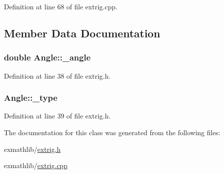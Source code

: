 Definition at line 68 of file extrig.\+cpp.



\subsection{Member Data Documentation}
\subsubsection[{\texorpdfstring{\+\_\+angle}{_angle}}]{\setlength{\rightskip}{0pt plus 5cm}double Angle\+::\+\_\+angle}\hypertarget{class_angle_a0020e88f3886809c93dbb7debc689c51}{}\label{class_angle_a0020e88f3886809c93dbb7debc689c51}


Definition at line 38 of file extrig.\+h.

\subsubsection[{\texorpdfstring{\+\_\+type}{_type}}]{ Angle\+::\+\_\+type}\hypertarget{class_angle_a4f2ca93e511d9ba985574464b4899355}{}\label{class_angle_a4f2ca93e511d9ba985574464b4899355}


Definition at line 39 of file extrig.\+h.



The documentation for this class was generated from the following files\+:\begin{DoxyCompactItemize}
\item 
exmathlib/\hyperlink{extrig_8h}{extrig.\+h}\item 
exmathlib/\hyperlink{extrig_8cpp}{extrig.\+cpp}\end{DoxyCompactItemize}
